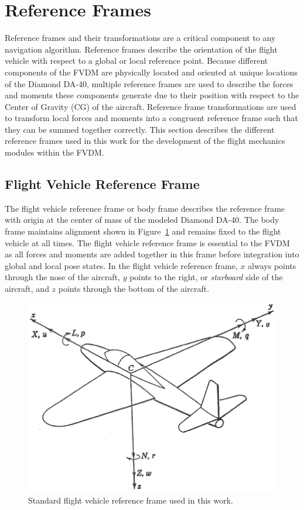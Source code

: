 \section{\textbf{Reference Frames}}
Reference frames and their transformations are a critical component to any navigation algorithm. Reference frames describe the orientation of the flight vehicle with respect to a global or local reference point. Because different components of the FVDM are physically located and oriented at unique locations of the Diamond DA-40, multiple reference frames are used to describe the forces and moments these components generate due to their position with respect to the Center of Gravity (CG) of the aircraft. Reference frame transformations are used to transform local forces and moments into a congruent reference frame such that they can be summed together correctly. This section describes the different reference frames used in this work for the development of the flight mechanics modules within the FVDM\@.
\subsection{\textbf{Flight Vehicle Reference Frame}}\label{section:FVRF}
The flight vehicle reference frame or body frame describes the reference frame with origin at the center of mass of the modeled Diamond DA-40. The body frame maintains alignment shown in Figure~\ref{fig:flightvehiclereferenceframe} and remains fixed to the flight vehicle at all times. The flight vehicle reference frame is essential to the FVDM as all forces and moments are added together in this frame before integration into global and local pose states. In the flight vehicle reference frame, \(x\) always points through the nose of the aircraft, \(y\) points to the right, or \textit{starboard} side of the aircraft, and \(z\) points through the bottom of the aircraft.

\begin{figure}[!ht]
    \centering
    \includegraphics[width=0.60\linewidth]{Figures/bodyframe.png}
    \caption{Standard flight vehicle reference frame used in this work.~\cite{peetSpacecraftAircraftDynamics2021}}\label{fig:flightvehiclereferenceframe}
\end{figure}
\clearpage
